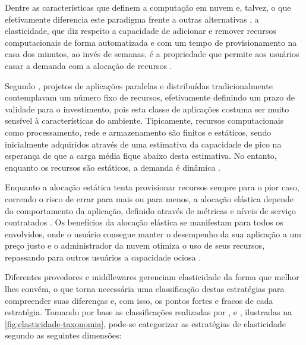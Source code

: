 \documentclass[english,brazilian]{UNISINOSmonografia} %
\begin{document}
Dentre as características que definem a computação em nuvem e, talvez, o que efetivamente diferencia este paradigma frente a outras alternativas \cite{Galante2012}, a elasticidade, que diz respeito a capacidade de adicionar e remover recursos computacionais de forma automatizada e com um tempo de provisionamento na casa dos minutos, ao invés de semanas, é a propriedade que permite aos usuários casar a demanda com a alocação de recursos \cite{Armbrust:EECS-2009-28,Raveendran2011,Imai2012,Suleiman2012}.

Segundo , projetos de aplicações paralelas e distribuídas tradicionalmente contemplavam um número fixo de recursos, efetivamente definindo um prazo de validade para o investimento, pois esta classe de aplicações costuma ser muito sensível à características do ambiente. 
Tipicamente, recursos computacionais como processamento, rede e armazenamento são finitos e estáticos, sendo inicialmente adquiridos através de uma estimativa da capacidade de pico na esperança de que a carga média fique abaixo desta estimativa. No entanto, enquanto os recursos são estáticos, a demanda é dinâmica \cite{Marshall2010}.

Enquanto a alocação estática tenta provisionar recursos sempre para o pior caso, correndo o risco de errar para mais ou para menos, a alocação elástica depende do comportamento da aplicação, definido através de métricas e níveis de serviço contratados \cite{Righi2013}. 
Os benefícios da alocação elástica se manifestam para todos os envolvidos, onde o usuário consegue manter o desempenho da sua aplicação a um preço justo e o administrador da nuvem otimiza o uso de seus recursos, repassando para outros usuários a capacidade ociosa \cite{Raveendran2011,Righi2013,HennessyPatterson2013}.


Diferentes provedores e middlewares gerenciam elasticidade da forma que melhor lhes convém, o que torna necessária uma classificação destas estratégias para compreender suas diferenças e, com isso, os pontos fortes e fracos de cada estratégia.
Tomando por base as classificações realizadas por ,  e , ilustradas na \autoref{fig:elasticidade-taxonomia}, pode-se categorizar as estratégias de elasticidade segundo as seguintes dimensões:
\end{document}
